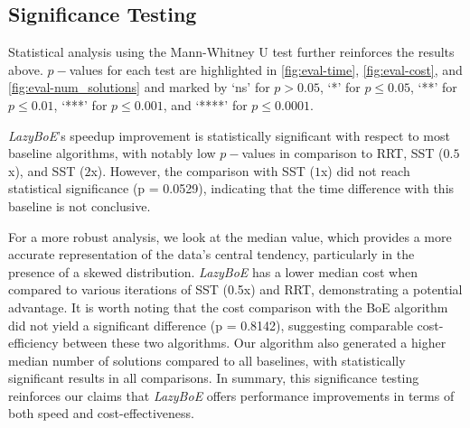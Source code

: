 


\subsection{Significance Testing}

Statistical analysis using the Mann-Whitney U test further reinforces the results above.
$p-$values for each test are highlighted in \cref{fig:eval-time}, \cref{fig:eval-cost}, and \cref{fig:eval-num_solutions} and marked by `ns' for $p > 0.05$, `*' for $p \leq 0.05$, `**' for $p \leq 0.01$, `***' for $p \leq 0.001$, and `****' for $p \leq 0.0001$.

\textsl{LazyBoE}'s speedup improvement is statistically significant with respect to most baseline algorithms, with notably low $p-$values in comparison to RRT, SST ($0.5$x), and SST ($2$x). However, the comparison with SST ($1$x) did not reach statistical significance (p = 0.0529), indicating that the time difference with this baseline is not conclusive.

For a more robust analysis, we look at the median value, which provides a more accurate representation of the data's central tendency, particularly in the presence of a skewed distribution.
\textsl{LazyBoE} has a lower median cost when compared to various iterations of SST (0.5x) and RRT, demonstrating a potential advantage. It is worth noting that the cost comparison with the BoE algorithm did not yield a significant difference (p = 0.8142), suggesting comparable cost-efficiency between these two algorithms.
Our algorithm also generated a higher median number of solutions compared to all baselines, with statistically significant results in all comparisons.
In summary, this significance testing reinforces our claims that \textsl{LazyBoE} offers performance improvements in terms of both speed and cost-effectiveness.
